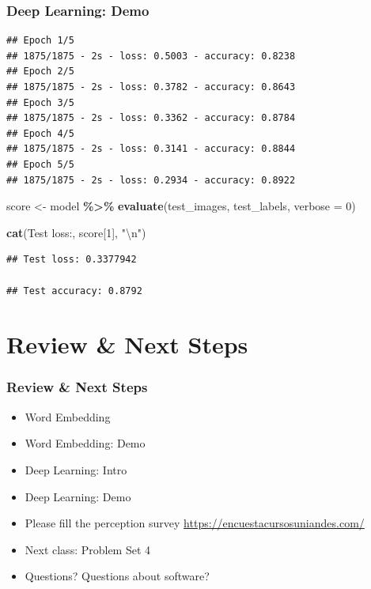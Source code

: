 \documentclass[
  shownotes,
  xcolor={svgnames},
  hyperref={colorlinks,citecolor=DarkBlue,linkcolor=DarkRed,urlcolor=DarkBlue}
  , aspectratio=169]{beamer}
\newenvironment{Shaded}{\begin{snugshade}}{\end{snugshade}}
\newcommand{\CharTok}[1]{\textcolor[rgb]{0.31,0.60,0.02}{#1}}
\newcommand{\DataTypeTok}[1]{\textcolor[rgb]{0.13,0.29,0.53}{#1}}
\newcommand{\DecValTok}[1]{\textcolor[rgb]{0.00,0.00,0.81}{#1}}
\newcommand{\KeywordTok}[1]{\textcolor[rgb]{0.13,0.29,0.53}{\textbf{#1}}}
\newcommand{\NormalTok}[1]{#1}
\newcommand{\OperatorTok}[1]{\textcolor[rgb]{0.81,0.36,0.00}{\textbf{#1}}}
\newcommand{\StringTok}[1]{\textcolor[rgb]{0.31,0.60,0.02}{#1}}
\begin{document}
\begin{frame}[fragile]
\frametitle{Deep Learning: Demo}
\begin{scriptsize}
\begin{verbatim}
## Epoch 1/5
## 1875/1875 - 2s - loss: 0.5003 - accuracy: 0.8238
## Epoch 2/5
## 1875/1875 - 2s - loss: 0.3782 - accuracy: 0.8643
## Epoch 3/5
## 1875/1875 - 2s - loss: 0.3362 - accuracy: 0.8784
## Epoch 4/5
## 1875/1875 - 2s - loss: 0.3141 - accuracy: 0.8844
## Epoch 5/5
## 1875/1875 - 2s - loss: 0.2934 - accuracy: 0.8922
\end{verbatim}
\end{scriptsize}

\begin{Shaded}
\begin{Highlighting}[]
\NormalTok{score \textless{}{-}}\StringTok{ }\NormalTok{model }\OperatorTok{\%\textgreater{}\%}\StringTok{ }\KeywordTok{evaluate}\NormalTok{(test\_images, test\_labels, }\DataTypeTok{verbose =} \DecValTok{0}\NormalTok{)}

\KeywordTok{cat}\NormalTok{(}\StringTok{\textquotesingle{}Test loss:\textquotesingle{}}\NormalTok{, score[}\DecValTok{1}\NormalTok{], }\StringTok{"}\CharTok{\textbackslash{}n}\StringTok{"}\NormalTok{)}
\end{Highlighting}
\end{Shaded}
\begin{scriptsize}

\begin{verbatim}
## Test loss: 0.3377942

## Test accuracy: 0.8792
\end{verbatim}
\end{scriptsize}
\end{frame}

\section{Review
 \& Next Steps}
\begin{frame}
\frametitle{Review \& Next Steps}
  
\begin{itemize} 
  
\item  Word Embedding
\item  Word Embedding: Demo
\item  Deep Learning: Intro
\item  Deep Learning: Demo
\bigskip
\item Please fill the perception survey \url{https://encuestacursosuniandes.com/}
    \bigskip  
  \item  Next class:  Problem Set 4


\bigskip  
\item Questions? Questions about software? 

\end{itemize}
\end{frame}
\end{document}

